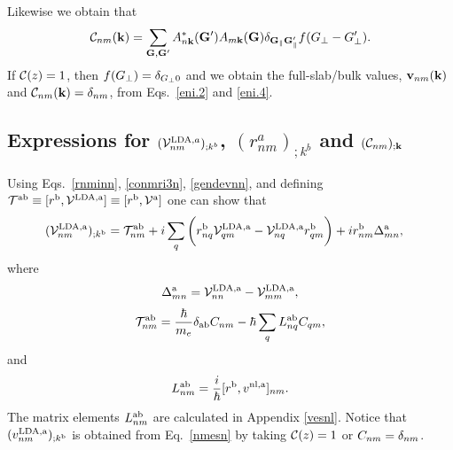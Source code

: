 \documentclass[floatfix,prb,aps,superscriptaddress,showpacs,11pt,preprint,letterpaper]{revtex4}
\begin{document}
Likewise we obtain that
\begin{align}\label{eni.4}
{\mathbf{\cal C}}_{nm}(\mathbf{k})=
\sum_{\mathbf{G},\mathbf{G}'} A^*_{n\mathbf{k}}(\mathbf{G}')  A_{m\mathbf{k}}(\mathbf{G})
\delta_{\mathbf{G}_\parallel \mathbf{G}'_\parallel} 
f(G_\perp-G'_\perp)
.
\end{align}  
If ${\mathbf{\cal C}}(z)=1$, then $f(G_\perp)=\delta_{G_\perp 0}$ and we 
obtain the full-slab/bulk values, 
$\mathbf{v}_{nm}(\mathbf{k})$ and ${\mathbf{\cal C}}_{nm}(\mathbf{k})=\delta_{nm}$,
from Eqs.~\eqref{eni.2} and \eqref{eni.4}.

\subsection{Expressions for 
\texorpdfstring{$({\mathbf{\cal V}}^{\mathrm{LDA},a}_{nm})_{;k^b}$}{Vnonlocal},
\texorpdfstring{$(r^a_{nm})_{;k^b}$}{Vnonlocal}
and \texorpdfstring{$({\mathbf{\cal C}}_{nm})_{;\mathbf{k}}$}{Vnonlocal}
}\label{appvnl}

Using Eqs.~\eqref{rnminn}, \eqref{conmri3n}, \eqref{gendevnn}, and
defining 
$
{\cal T}^{\mathrm{a}\mathrm{b}}\equiv[r^{\mathrm{b}},{\mathbf{\cal V}}^{\mathrm{LDA},\mathrm{a}}]
\equiv
[r^{\mathrm{b}},{\mathbf{\cal V}}^{\mathrm{a}}]
$
one can show that
\begin{align}\label{nmesn}
({\mathbf{\cal V}}^{\mathrm{LDA},\mathrm{a}}_{nm})_{;k^{\mathrm{b}}}&=
{\cal T}_{nm}^{\mathrm{a}\mathrm{b}}
+i
\sum_{q}
\bigg(
r^{\mathrm{b}}_{nq}  
{\mathbf{\cal V}}^{\mathrm{LDA},\mathrm{a}}_{q m}
-
{\mathbf{\cal V}}^{\mathrm{LDA},\mathrm{a}}_{nq}   
r^{\mathrm{b}}_{q m}
\bigg)  
+i  
r^{\mathrm{b}}_{nm}
\Delta^{\mathrm{a}}_{mn}
,
\end{align}
where
\begin{eqnarray}\label{tdel}
\Delta^{\mathrm{a}}_{mn}
=
{\mathbf{\cal V}}^{\mathrm{LDA},\mathrm{a}}_{nn}  
-
{\mathbf{\cal V}}^{\mathrm{LDA},\mathrm{a}}_{mm}  
,
\end{eqnarray} 
\begin{align}\label{tau.1}
{\cal T}_{nm}^{\mathrm{a}\mathrm{b}}
=
\frac{\hbar}{m_e}\delta_{\mathrm{a}\mathrm{b}} 
C_{nm} 
-\hbar 
\sum_q  
L^{\mathrm{a}\mathrm{b}}_{nq} 
C_{qm} 
,
\end{align}   
and
\begin{align}\label{lab}
L_{nm}^{\mathrm{a}\mathrm{b}}
=\frac{i}{\hbar}[r^{\mathrm{b}},v^{\mathrm{nl},\mathrm{a}}]_{nm}
.
\end{align}  
The matrix elements $L^{\mathrm{a}\mathrm{b}}_{nm}$
are calculated in Appendix \ref{vesnl}.
Notice that
$(v^{\mathrm{LDA},\mathrm{a}}_{nm})_{;k^{\mathrm{b}}}$ is obtained 
from Eq.~\eqref{nmesn} by 
taking 
${\mathbf{\cal C}}(z)=1$ or $C_{nm}=\delta_{nm}$.
\end{document}
